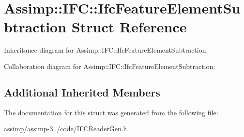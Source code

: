 \hypertarget{struct_assimp_1_1_i_f_c_1_1_ifc_feature_element_subtraction}{\section{Assimp\+:\+:I\+F\+C\+:\+:Ifc\+Feature\+Element\+Subtraction Struct Reference}
\label{struct_assimp_1_1_i_f_c_1_1_ifc_feature_element_subtraction}
}


Inheritance diagram for Assimp\+:\+:I\+F\+C\+:\+:Ifc\+Feature\+Element\+Subtraction\+:


Collaboration diagram for Assimp\+:\+:I\+F\+C\+:\+:Ifc\+Feature\+Element\+Subtraction\+:
\subsection*{Additional Inherited Members}


The documentation for this struct was generated from the following file\+:\begin{DoxyCompactItemize}
\item 
assimp/assimp-\/3../code/I\+F\+C\+Reader\+Gen.\+h\end{DoxyCompactItemize}

